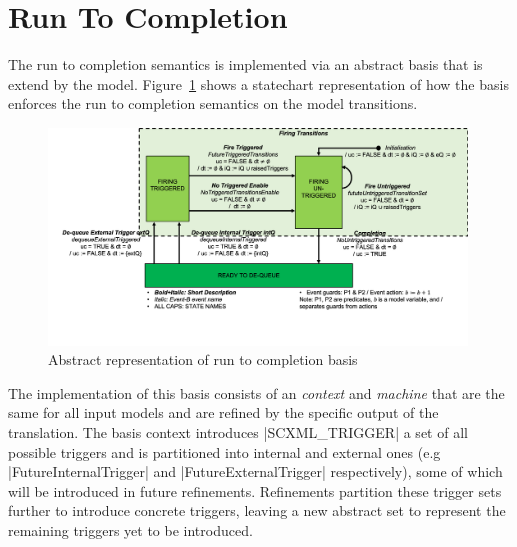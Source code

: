 

\section{Run To Completion}

The run to completion semantics is implemented via an abstract basis that is extend by the model. 
Figure~\ref{fig:basis} shows a statechart representation of how the basis enforces 
the run to completion semantics on the model transitions. 
\begin{figure}[!h]
	\vspace{-.4cm}
	\centering
	\includegraphics[width=0.99\textwidth, trim=0 100 0 0]{figures/Picture8.png}
	\caption{Abstract representation of run to completion basis}
	\label{fig:basis}
	\vspace{-.4cm}
\end{figure}

The implementation of this basis consists of an \EVENTB \emph{context} and \emph{machine} that are 
the same for all input models and are refined by the specific output of the translation.  
The basis context introduces |SCXML_TRIGGER| a set of all 
possible triggers  and is partitioned into internal and external ones 
(e.g |FutureInternalTrigger| and |FutureExternalTrigger| respectively), 
some of which will be introduced in future refinements. 
Refinements partition these trigger sets further to introduce concrete triggers, 
leaving a new abstract set to represent the remaining triggers yet to be introduced. 

